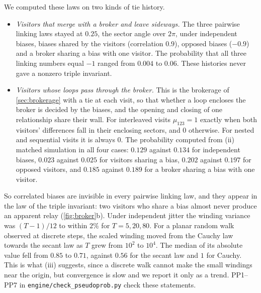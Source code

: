 \documentclass[11pt]{article}
\theoremstyle{definition}\newtheorem{definition}[theorem]{Definition}\newtheorem{remark}[theorem]{Remark}\newtheorem{example}[theorem]{Example}\newtheorem{problem}[theorem]{Open problem}\crefname{problem}{Problem}{Problems}
\begin{document}
We computed these laws on two kinds of tie history.
\begin{itemize}
\item \emph{Visitors that merge with a broker and leave sideways.} The three pairwise linking laws stayed at $0.25$, the sector angle over $2\pi$, under independent biases, biases shared by the visitors (correlation $0.9$), opposed biases ($-0.9$) and a broker sharing a bias with one visitor. The probability that all three linking numbers equal $-1$ ranged from $0.004$ to $0.06$. These histories never gave a nonzero triple invariant.
\item \emph{Visitors whose loops pass through the broker.} This is the brokerage of \cref{sec:brokerage} with a tie at each visit, so that whether a loop encloses the broker is decided by the biases, and the opening and closing of one relationship share their wall. For interleaved visits $\mu_{123}=1$ exactly when both visitors' differences fall in their enclosing sectors, and $0$ otherwise. For nested and sequential visits it is always $0$. The probability computed from (ii) matched simulation in all four cases: $0.129$ against $0.134$ for independent biases, $0.023$ against $0.025$ for visitors sharing a bias, $0.202$ against $0.197$ for opposed visitors, and $0.185$ against $0.189$ for a broker sharing a bias with one visitor.
\end{itemize}
So correlated biases are invisible in every pairwise linking law, and they appear in the law of the triple invariant: two visitors who share a bias almost never produce an apparent relay (\cref{fig:broker}b). Under independent jitter the winding variance was $(T-1)/12$ to within $2\%$ for $T=5,20,80$. For a planar random walk observed at discrete steps, the scaled winding moved from the Cauchy law towards the secant law as $T$ grew from $10^2$ to $10^4$. The median of its absolute value fell from $0.85$ to $0.71$, against $0.56$ for the secant law and $1$ for Cauchy. This is what (iii) suggests, since a discrete walk cannot make the small windings near the origin, but convergence is slow and we report it only as a trend. PP1--PP7 in \texttt{engine/check\_pseudoprob.py} check these statements.
\end{document}
